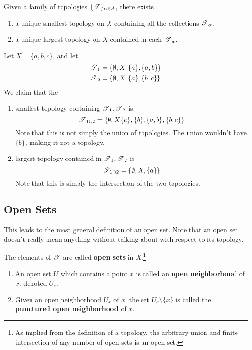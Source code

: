   \begin{corollary}
    Given a family of topologies $\{\operatorname{\mathscr{T}}\}_{\alpha \in A}$, there exists 
    \begin{enumerate}
      \item a unique smallest topology on $X$ containing all the collections $\operatorname{\mathscr{T}}_\alpha$. 
      \item a unique largest topology on $X$ contained in each $\operatorname{\mathscr{T}}_\alpha$. 
    \end{enumerate}
  \end{corollary} 

  \begin{example}
    Let $X = \{a, b, c\}$, and let 
    \begin{align}
      \operatorname{\mathscr{T}}_1 & = \{\emptyset, X, \{a\}, \{a, b\}\} \\
      \operatorname{\mathscr{T}}_2 & = \{\emptyset, X, \{a\}, \{b, c\}\}
    \end{align}
    We claim that the 
    \begin{enumerate}
      \item smallest topology containing $\operatorname{\mathscr{T}}_1, \operatorname{\mathscr{T}}_2$ is 
      \begin{equation}
        \operatorname{\mathscr{T}}_{1 \cup 2} = \{\emptyset, X \{a\}, \{b\}, \{a, b\}, \{b, c\}\}
      \end{equation} 
      Note that this is not simply the union of topologies. The union wouldn't have $\{b\}$, making it not a topology. 

      \item largest topology contained in $\operatorname{\mathscr{T}}_1, \operatorname{\mathscr{T}}_2$ is 
      \begin{equation}
        \operatorname{\mathscr{T}}_{1 \cap 2} = \{\emptyset, X, \{a\}\}
      \end{equation}
      Note that this is simply the intersection of the two topologies. 
    \end{enumerate}
  \end{example}

\subsection{Open Sets}

  This leads to the most general definition of an open set. Note that an open set doesn't really mean anything without talking about with respect to its topology. 

  \begin{definition}
    The elements of $\operatorname{\mathscr{T}}$ are called \textbf{open sets} in $X$.\footnote{As implied from the definition of a topology, the arbitrary union and finite intersection of any number of open sets is an open set.} 
    \begin{enumerate}
      \item An open set $U$ which contains a point $x$ is called an \textbf{open neighborhood} of $x$, denoted $U_x$. 
      \item Given an open neighborhood $U_x$ of $x$, the set $U_x \setminus \{x\}$ is called the \textbf{punctured open neighborhood} of $x$. 
    \end{enumerate}
  \end{definition}


